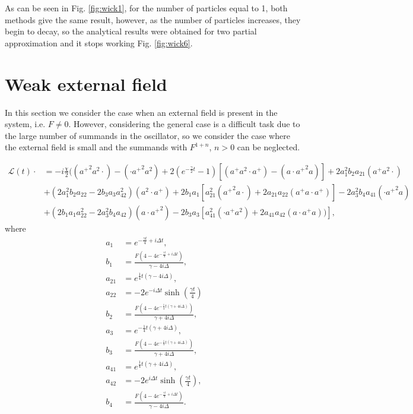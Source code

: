 \documentclass[12pt]{article}
\theoremstyle{definition}
\def\ga {\gamma}
\begin{document}
	As can be seen in Fig. \ref{fig:wick1}, for the number of particles equal to 1, both methods give the same result, however, as the number of particles increases, they begin to decay, so the analytical results were obtained for two partial approximation and it stops working Fig. \ref{fig:wick6}.
	
	\section{Weak external field\label{sec:Efc}}
	
	In this section we consider the case when an external field is present in the system, i.e. $F \not= 0$. However, considering the general case is a difficult task due to the large number of summands in the oscillator, so we consider the case where the external field is small and the summands with $F^{1 + n}$, $n > 0$ can be neglected. 
	
	\begin{align}
		\label{eq:GenIntWithF}
		\mathcal{L}(t)\cdot &= -i\frac{\chi}{2}(({a^+}^2a^2\cdot) - (\cdot{a^+}^2a^2) + 2(e^{-\frac{\ga}{2}t} -1 ) [({a^+}a^2\cdot {a^+}) - (a\cdot{a^+}^2a) ] +2a_1^2b_2a_{21}({a^+}a^2\cdot) \nonumber\\
		&+ (2a_1^2b_2a_{22} - 2b_3a_3a_{42}^2)(a^2\cdot{a^+}) + 2b_1a_1 [a_{21}^2({a^+}^2a\cdot) + 2a_{21}a_{22}({a^+}a\cdot{a^+})] - 2a_3^2b_4a_{41}(\cdot{a^+}^2a) \\
		&+ (2b_1a_1a_{22}^2 - 2a_3^2b_4a_{42})(a\cdot{a^+}^2) - 2b_3a_3[a_{41}^2(\cdot{a^+}a^2) + 2 a_{41}a_{42}(a\cdot{a^+}a)) ]\nonumber,
	\end{align}
	where
	\begin{align*}
		a_1 &= e^{-\frac{\gamma  t}{4}+i \Delta  t}, \\
		b_1 &= \frac{F \left(4-4 e^{-\frac{\gamma  t}{4}+i \Delta  t}\right)}{\gamma -4 i \Delta },\\
		a_{21} &= e^{\frac{1}{4} t (\gamma -4 i \Delta )},\\
		a_{22} &= -2 e^{-i \Delta  t} \sinh \left(\frac{\gamma  t}{4}\right)\\
		b_2 &= \frac{F \left(4-4 e^{-\frac{1}{4} t (\gamma +4 i \Delta )}\right)}{\gamma +4 i \Delta },\\
		a_3 &= e^{-\frac{1}{4} t (\gamma +4 i \Delta )},\\
		b_3 &= \frac{F \left(4-4 e^{-\frac{1}{4} t (\gamma +4 i \Delta )}\right)}{\gamma +4 i \Delta },\\
		a_{41} &= e^{\frac{1}{4} t (\gamma +4 i \Delta )},\\
		a_{42} &= -2 e^{i \Delta  t} \sinh \left(\frac{\gamma  t}{4}\right),\\
		b_4 &= \frac{F \left(4-4 e^{-\frac{\gamma  t}{4}+i \Delta  t}\right)}{\gamma -4 i \Delta }.
	\end{align*}
	
\end{document}
